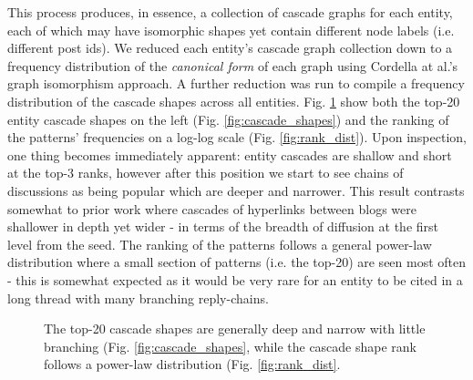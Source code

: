\documentclass[10pt,journal,compsoc]{IEEEtran}
\begin{document}
This process produces, in essence, a collection of cascade graphs for each entity, each of which may have isomorphic shapes yet contain different node labels (i.e. different post ids).
We reduced each entity's cascade graph collection down to a frequency distribution of the \emph{canonical form} of each graph using Cordella at al.'s \cite{cordella2001improved} graph isomorphism approach.
A further reduction was run to compile a frequency distribution of the cascade shapes across all entities.
Fig. \ref{fig:entity_cascades} show both the top-20 entity cascade shapes on the left (Fig. \ref{fig:cascade_shapes}) and the ranking of the patterns' frequencies on a log-log scale (Fig. \ref{fig:rank_dist}).
Upon inspection, one thing becomes immediately apparent: entity cascades are shallow and short at the top-3 ranks, however after this position we start to see chains of discussions as being popular which are deeper and narrower.
This result contrasts somewhat to prior work \cite{leskovec2007patterns} where cascades of hyperlinks between blogs were shallower in depth yet wider - in terms of the breadth of diffusion at the first level from the seed. 
The ranking of the patterns follows a general power-law distribution where a small section of patterns (i.e. the top-20) are seen most often - this is somewhat expected as it would be very rare for an entity to be cited in a long thread with many branching reply-chains.

\begin{figure}[ht!]
  \begin{center}
  \end{center}    
  \caption{The top-20 cascade shapes are generally deep and narrow with little branching (Fig. \ref{fig:cascade_shapes}, while the cascade shape rank follows a power-law distribution (Fig. \ref{fig:rank_dist}.}
  \label{fig:entity_cascades}
\end{figure}
\end{document}
